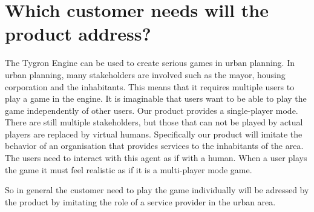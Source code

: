 \section{Which customer needs will the product address?}



The Tygron Engine can be used to create serious games in urban planning. In urban planning, many stakeholders are involved such as the mayor, housing corporation and the inhabitants. This means that it requires multiple users to play a game in the engine. It is imaginable that users want to be able to play the game independently of other users. Our product provides a single-player mode. There are still multiple stakeholders, but those that can not be played by actual players are replaced by virtual humans. Specifically our product will imitate the behavior of an organisation that provides services to the inhabitants of the area. The users need to interact with this agent as if with a human. When a user plays the game it must feel realistic as if it is a multi-player mode game. \newline



So in general the customer need to play the game individually will be adressed by the product by imitating the role of a service provider in the urban area.
